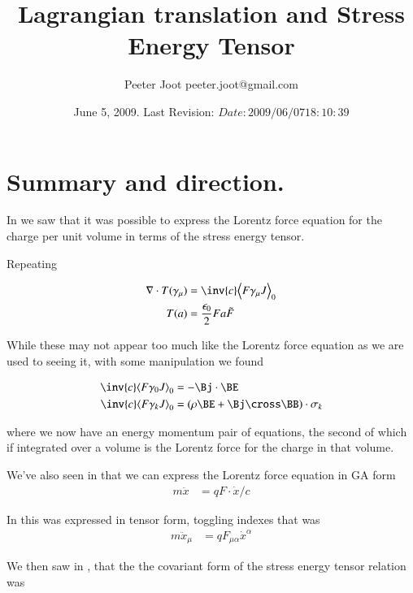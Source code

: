 \documentclass{article}
\title{Lagrangian translation and Stress Energy Tensor}\label{chap:stress_energy_noethers}
\author{Peeter Joot \quad peeter.joot@gmail.com }
\date{ June 5, 2009.  Last Revision: $Date: 2009/06/07 18:10:39 $ }
\begin{document}
\maketitle{}
\tableofcontents
\section{ Summary and direction. }

In 
\cite{PJstressEnergyLorentz} 
we saw that it was
possible to express the Lorentz force equation for the charge per unit
volume in terms of the stress energy tensor.

Repeating 

\begin{align}
\grad \cdot T(\gamma_\mu) &= \inv{c} \gpgradezero{ F \gamma_\mu J } \\
T(a) &= \frac{\epsilon_0}{2} F a \tilde{F}
\end{align}

While these
may not appear too much like the Lorentz force equation as we are used
to seeing it, with some manipulation we found 

\begin{align}
\inv{c} \gpgradezero{ F \gamma_0 J } &= -\Bj \cdot \BE \\
\inv{c} \gpgradezero{ F \gamma_k J } &= (\rho \BE + \Bj \cross \BB) \cdot \sigma_k
\end{align}

where we now have an energy momentum pair of equations, the second
of which if integrated over a volume is the Lorentz force for the charge
in that volume.

We've also seen in
that we can express the Lorentz force equation in GA form
\begin{align}
m \ddot{x} &= q F \cdot \dot{x}/c
\end{align}

In 
this was expressed in tensor form, toggling indexes that was
\begin{align}
m \ddot{x}_\mu &= {q} F_{\mu\alpha} \dot{x}^\alpha
\end{align}

We then saw in
\cite{PJenMtensor}
, that the
the covariant form of the stress energy tensor relation was
\end{document}
